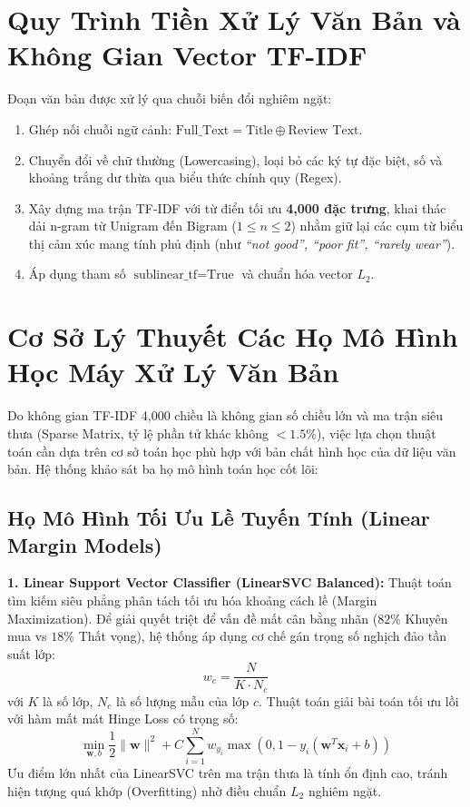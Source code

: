 \documentclass[12pt,a4paper]{report}
\begin{document}
\section{Quy Trình Tiền Xử Lý Văn Bản và Không Gian Vector TF-IDF}
Đoạn văn bản được xử lý qua chuỗi biến đổi nghiêm ngặt:
\begin{enumerate}
    \item Ghép nối chuỗi ngữ cảnh: $\text{Full\_Text} = \text{Title} \oplus \text{Review Text}$.
    \item Chuyển đổi về chữ thường (Lowercasing), loại bỏ các ký tự đặc biệt, số và khoảng trắng dư thừa qua biểu thức chính quy (Regex).
    \item Xây dựng ma trận TF-IDF với từ điển tối ưu \textbf{4,000 đặc trưng}, khai thác dải n-gram từ Unigram đến Bigram ($1 \le n \le 2$) nhằm giữ lại các cụm từ biểu thị cảm xúc mang tính phủ định (như \textit{``not good'', ``poor fit'', ``rarely wear''}).
    \item Áp dụng tham số $\text{sublinear\_tf} = \text{True}$ và chuẩn hóa vector $L_2$.
\end{enumerate}

\section{Cơ Sở Lý Thuyết Các Họ Mô Hình Học Máy Xử Lý Văn Bản}
Do không gian TF-IDF 4,000 chiều là không gian số chiều lớn và ma trận siêu thưa (Sparse Matrix, tỷ lệ phần tử khác không $< 1.5\%$), việc lựa chọn thuật toán cần dựa trên cơ sở toán học phù hợp với bản chất hình học của dữ liệu văn bản. Hệ thống khảo sát ba họ mô hình toán học cốt lõi:

\subsection{Họ Mô Hình Tối Ưu Lề Tuyến Tính (Linear Margin Models)}
\textbf{1. Linear Support Vector Classifier (LinearSVC Balanced):}
Thuật toán tìm kiếm siêu phẳng phân tách tối ưu hóa khoảng cách lề (Margin Maximization). Để giải quyết triệt để vấn đề mất cân bằng nhãn ($82\%$ Khuyên mua vs $18\%$ Thất vọng), hệ thống áp dụng cơ chế gán trọng số nghịch đảo tần suất lớp:
\begin{equation}
w_c = \frac{N}{K \cdot N_c}
\end{equation}
với $K$ là số lớp, $N_c$ là số lượng mẫu của lớp $c$. Thuật toán giải bài toán tối ưu lồi với hàm mất mát Hinge Loss có trọng số:
\begin{equation}
\min_{\mathbf{w}, b} \frac{1}{2} \|\mathbf{w}\|^2 + C \sum_{i=1}^N w_{y_i} \max(0, 1 - y_i(\mathbf{w}^T \mathbf{x}_i + b))
\end{equation}
Ưu điểm lớn nhất của LinearSVC trên ma trận thưa là tính ổn định cao, tránh hiện tượng quá khớp (Overfitting) nhờ điều chuẩn $L_2$ nghiêm ngặt.
\end{document}
